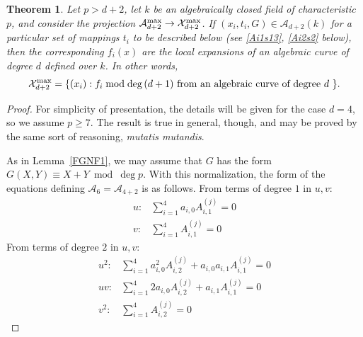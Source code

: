 \documentclass[12pt]{amsart}
\theoremstyle{theorem}
\newtheorem{thm}{Theorem}
\begin{document}
\begin{thm}
Let $p > d + 2$, let $k$ be an algebraically closed field of characteristic $p$, 
and consider the projection $\mathcal{A}_{d+2}^{\rm max} \to \mathcal{X}_{d+2}^{\rm max}$.  If $(x_i, t_i, G) \in \mathcal{A}_{d+2}(k)$
for a particular set of mappings $t_i$ to be described below (see \eqref{Ai1s13}, \eqref{Ai2s2} below), then
the corresponding $f_i(x)$ are the local expansions of an algebraic curve of degree $d$ defined over $k$.  In other words, 
$$\mathcal{X}_{d+2}^{\rm max} =
 \{(x_i) : f_i \bmod \deg\, (d+1) \text{ from an algebraic curve of degree $d$ }\}.$$
\end{thm}

\begin{proof}
For simplicity of presentation, the details will be given for the case $d = 4$, so we assume $p \ge 7$.  The result is 
true in general, though, and may be proved by the same sort of reasoning, \emph{mutatis mutandis}.

As in Lemma~\ref{FGNF1}, we may assume that $G$
has the form $G(X,Y) \equiv X + Y \bmod \deg p$.   With this normalization, the 
form of the equations defining $\mathcal{A}_6 = \mathcal{A}_{4 + 2}$ is as follows.
From terms of degree $1$ in $u,v$:
\begin{align*}
u : &\sum_{i=1}^4 a_{i,0} A_{i,1}^{(j)} =0\\
v:  &\sum_{i=1}^4 A_{i,1}^{(j)} = 0
\end{align*}
From terms of degree $2$ in $u,v$:
\begin{align*}
u^2: &\sum_{i=1}^4 a_{i,0}^2 A_{i,2}^{(j)} + a_{i,0} a_{i,1} A_{i,1}^{(j)} = 0\\
uv: &\sum_{i=1}^4 2 a_{i,0} A_{i,2}^{(j)} + a_{i,1} A_{i,1}^{(j)} = 0\\
v^2: &\sum_{i=1}^4 A_{i,2}^{(j)} = 0
\end{align*}


\end{proof}
\end{document}
